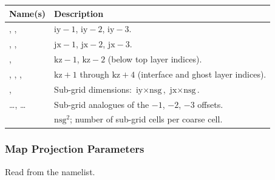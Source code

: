 \begin{longtable}{L{3.5cm} L{8.5cm}}
  \toprule
  \textbf{Name(s)} & \textbf{Description} \\
  \midrule
  \endhead
  \bottomrule
  \endfoot
  , ,  &
    $\text{iy}-1$, $\text{iy}-2$, $\text{iy}-3$. \\
  , ,  &
    $\text{jx}-1$, $\text{jx}-2$, $\text{jx}-3$. \\
  ,  &
    $\text{kz}-1$, $\text{kz}-2$ (below top layer indices). \\
  , , ,  &
    $\text{kz}+1$ through $\text{kz}+4$ (interface and ghost layer indices). \\
  ,  &
    Sub-grid dimensions: $\text{iy}\times\text{nsg}$, $\text{jx}\times\text{nsg}$. \\
  \ldots{}, \ldots{} &
    Sub-grid analogues of the $-1$, $-2$, $-3$ offsets. \\
   &
    $\text{nsg}^2$; number of sub-grid cells per coarse cell. \\
\end{longtable}

\subsubsection{Map Projection Parameters}

Read from the  namelist.

